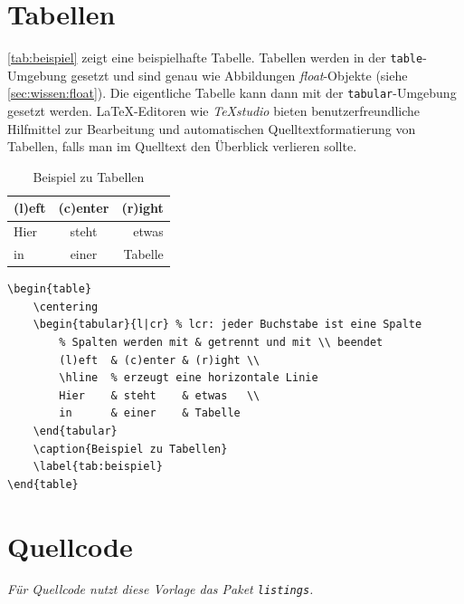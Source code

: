 	\section{Tabellen}
		\autoref{tab:beispiel} zeigt eine beispielhafte Tabelle.
		Tabellen werden in der \lstinline[language=thesis-latexbeispiel]|table|-Umgebung gesetzt und sind genau wie Abbildungen \emph{float}-Objekte (siehe \autoref{sec:wissen:float}).
		Die eigentliche Tabelle kann dann \zb{} mit der \lstinline[language=thesis-latexbeispiel]|tabular|-Umgebung gesetzt werden.
		\LaTeX-Editoren wie \emph{TeXstudio} bieten benutzerfreundliche Hilfmittel zur Bearbeitung und automatischen Quelltextformatierung von Tabellen, falls man im Quelltext den Überblick verlieren sollte.
		\begin{table}[bh]
			\centering
			\begin{vorlagenbeispiel}
				\begin{tabular}{l|cr} %
					(l)eft  & (c)enter & (r)ight \\ %
					\hline                          %
					Hier    & steht    & etwas   \\
					in      & einer    & Tabelle
				\end{tabular}
			\end{vorlagenbeispiel}
			\caption{Beispiel zu Tabellen}
			\label{tab:beispiel}
		\end{table}
		\begin{lstlisting}[language=thesis-latexbeispiel]
\begin{table}
	\centering
	\begin{tabular}{l|cr} % lcr: jeder Buchstabe ist eine Spalte
		% Spalten werden mit & getrennt und mit \\ beendet
		(l)eft  & (c)enter & (r)ight \\	
		\hline  % erzeugt eine horizontale Linie
		Hier    & steht    & etwas   \\
		in      & einer    & Tabelle
	\end{tabular}
	\caption{Beispiel zu Tabellen}
	\label{tab:beispiel}
\end{table}
		\end{lstlisting}
		
		
	\section{Quellcode}
		\emph{Für Quellcode nutzt diese Vorlage das Paket \lstinline|listings|.}
		\medskip
		
